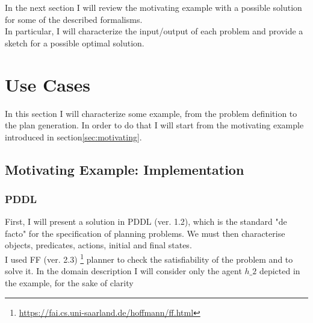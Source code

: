 \documentclass[pdftex,12pt,a4paper]{report}
\begin{document}
\noindent In the next section I will review the motivating example with a possible solution for some of the described formalisms. \\
In particular, I will characterize the input/output of each problem and provide a sketch for a possible optimal solution.

\chapter{Use Cases}\label{sec:use_cases}
In this section I will characterize some example, from the problem definition to the plan generation. In order to do that I will start from the motivating example introduced in section\ref{sec:motivating}.

\section{Motivating Example: Implementation}
\subsection{PDDL}
First, I will present a solution in PDDL (ver. 1.2), which is the standard "de facto" for the specification of planning problems. We must then characterise objects, predicates, actions, initial and final states.\\
I used FF (ver. 2.3) \footnote{\url{https://fai.cs.uni-saarland.de/hoffmann/ff.html}} planner to check the satisfiability of the problem and to solve it.
In the domain description I will consider only the agent $h\_2$ depicted in the example, for the sake of clarity \\
\end{document}
